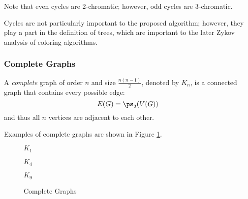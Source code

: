 Note that even cycles are \(2\)-chromatic; however, odd cycles are \(3\)-chromatic.

Cycles are not particularly important to the proposed algorithm; however, they play a part in the definition of
trees, which are important to the later Zykov analysis of coloring algorithms.

\subsubsection{Complete Graphs}

A \emph{complete} graph of order \(n\) and size \(\frac{n(n-1)}{2}\), denoted by \(K_n\), is a connected graph that
contains every possible edge:
\[E(G)=\ps_2(V(G))\]
and thus all \(n\) vertices are adjacent to each other.

Examples of complete graphs are shown in Figure \ref{fig:complete}.

\begin{figure}[h]
  \label{fig:complete}
  \begin{minipage}{2in}
    \begin{center}

      \bigskip

      \(K_1\)
    \end{center}
  \end{minipage}
  \begin{minipage}{2in}
    \begin{center}

      \bigskip

      \(K_4\)
    \end{center}
  \end{minipage}
  \begin{minipage}{2in}
    \begin{center}

      \bigskip

      \(K_9\)
    \end{center}
  \end{minipage}
  \caption{Complete Graphs}
\end{figure}

